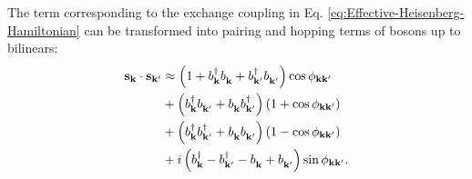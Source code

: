 \documentclass[english,aps,prd,nofootinbib,twocolumn]{revtex4-1}
\begin{document}
The term corresponding to the exchange coupling in Eq. \eqref{eq:Effective-Heisenberg-Hamiltonian} can be transformed into pairing and hopping terms of bosons up to bilinears:
\begin{equation}
\begin{split}
\mathbf{s}_{\mathbf{k }} \cdot \mathbf{s}_{\mathbf{k'}} &\approx 
\left(
1+
b_{\mathbf{k }}^{\textcolor{black}{\dagger}}
b_{\mathbf{k }}^{\textcolor{white}{\dagger}} + b_{\mathbf{k'}}^{\textcolor{black}{\dagger}}b_{\mathbf{k'}}^{\textcolor{white}{\dagger}}\right)  
\cos \phi_{\mathbf{k }\mathbf{k'}}
\\ &+ 
\left(
b_{\mathbf{k }}^{\textcolor{black}{\dagger}}
b_{\mathbf{k'}}^{\textcolor{white}{\dagger}} + 
b_{\mathbf{k }}^{\textcolor{white}{\dagger}}
b_{\mathbf{k'}}^{\textcolor{black}{\dagger}}\right) 
\left( 1 + \cos \phi_{\mathbf{k }\mathbf{k'}} \right) 
\\ &+ 
 \left(
b_{\mathbf{k }}^{\textcolor{black}{\dagger}}
b_{\mathbf{k'}}^{\textcolor{black}{\dagger}} + 
b_{\mathbf{k }}^{\textcolor{white}{\dagger}}
b_{\mathbf{k'}}^{\textcolor{white}{\dagger}}
\right) 
\left( 1 - \cos \phi_{\mathbf{k }\mathbf{k'}} \right)
\\ &+ i
 \left(
b_{\mathbf{k }}^{\textcolor{black}{\dagger}} - 
b_{\mathbf{k'}}^{\textcolor{black}{\dagger}} - 
b_{\mathbf{k }}^{\textcolor{white}{\dagger}} +
b_{\mathbf{k'}}^{\textcolor{white}{\dagger}}
\right) 
\sin \phi_{\mathbf{k }\mathbf{k'}}.
\end{split}
\end{equation}
\end{document}
